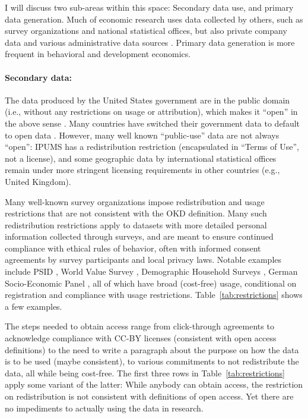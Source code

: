 \documentclass{article}
\begin{document}
I will discuss two sub-areas within this space: Secondary data use, and primary data generation. Much of economic research uses data collected by others, such as survey organizations and national statistical offices, but also private company data and various administrative data sources \citep[``organic data'', ][]{groves_designed_2011,groves_three_2011}. Primary data generation is more frequent in behavioral and development economics. 

\paragraph{Secondary data:} The data produced by the United States government are in the public domain (i.e., without any restrictions on usage or attribution), which makes it ``open'' in the above sense \citep[Copyright Act of 1976, ][]{wikipedia_copyright_2025}. Many countries have switched their government data to default to open data \parencite{statistics_canada_statistics_2012,uk_government_open_2014}. However, many well known ``public-use'' data are not always ``open'': IPUMS has a redistribution restriction (encapsulated in ``Terms of Use'', not a license), and some geographic data by international statistical offices remain under more stringent licensing requirements in other countries (e.g., United Kingdom). 

Many well-known survey organizations impose redistribution and usage restrictions that are not consistent with the OKD definition. Many such redistribution restrictions apply to datasets with more detailed personal information collected through surveys, and are meant to ensure continued compliance with ethical rules of behavior, often with informed consent agreements by survey participants and local privacy laws. Notable examples include  PSID \parencite{institute_for_social_research_panel_2024}, World Value Survey \parencite{haerpfer_world_2024}, Demographic Household Surveys \parencite{dhs_program_demographic_2024}, German Socio-Economic Panel \parencite{goebel_german_2019,goebel_socio-economic_2024}, all of which have broad (cost-free) usage, conditional on registration and compliance with usage restrictions. Table~\ref{tab:restrictions} shows a few examples. 



The steps needed to obtain access range from click-through agreements to acknowledge compliance with CC-BY licenses (consistent with open access definitions) to the need to write a paragraph about the purpose on how the data is to be used (maybe consistent), to various commitments to not redistribute the data, all while being cost-free. The first three rows in Table~\ref{tab:restrictions} apply some variant of the latter: While anybody can obtain access, the restriction on redistribution is not consistent with definitions of open access. Yet there are no impediments to actually using the data in research. 
\end{document}
